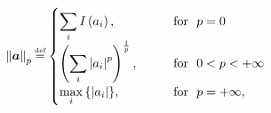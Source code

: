 \begin{equation*}
\mynorm{\boldsymbol{a}}_p \myeq 
\begin{cases}
    \displaystyle\sum_{i}^{} I \myparanthese{a_i}, & \qquad \text{for \ }p= 0\\
    \myparanthese{\displaystyle\sum_{i}^{} \myabs{a_i}^ p} ^ {\frac1p},  & \qquad  \text{for \ } 0 < p < +\infty\\
    \displaystyle\max_{i}{\mybrace{\myabs{a_i}}}, & \qquad \text{for \ } p= +\infty,
  \end{cases}
\end{equation*}